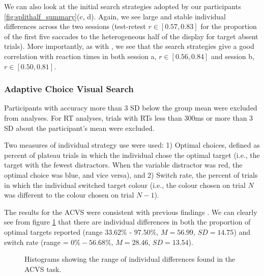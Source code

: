 \documentclass[]{rsos}%
\begin{document}
We can also look at the initial search strategies adopted by our participants \ref{fig:splithalf_summary}(c, d). Again, we see large and stable individual differences across the two sessions (test-retest $r \in [0.57, 0.83]$ for the proportion of the first five saccades to the heterogeneous half of the display for target absent trials). More importantly, as with \cite{nowakowska2017}, we see that the search strategies give a good correlation with reaction times in both session a, $r \in [0.56, 0.84]$ and session b, $r \in [0.50, 0.81]$.


\subsubsection{Adaptive Choice Visual Search}

Participants with accuracy more than 3 SD below the group mean were excluded from analyses. For RT analyses, trials with RTs less than 300ms or more than 3 SD about the participant's mean were excluded. 

Two measures of individual strategy use were used: 1) Optimal choices, defined as percent of plateau trials in which the individual chose the optimal target (i.e., the target with the fewest distractors. When the variable distractor was red, the optimal choice was blue, and vice versa), and 2) Switch rate, the percent of trials in which the individual switched target colour (i.e., the colour chosen on trial $N$ was different to the colour chosen on trial $N-1$).  


The results for the ACVS were consistent with previous findings \cite{irons-leber2016,irons-leber2018}. We can clearly see from figure \ref{fig:acvs_summary} that there are individual differences in both the proportion of optimal targets reported (range $33.62\%$ - $97.50\%$, $M = 56.99$, $SD = 14.75$) and switch rate (range = $0\% - 56.68\%$, $M = 28.46$, $SD = 13.54$). 

\begin{figure}
\centering
{}
\caption{Histograms showing the range of individual differences found in the ACVS task.}
\label{fig:acvs_summary}
\end{figure}
\end{document}
